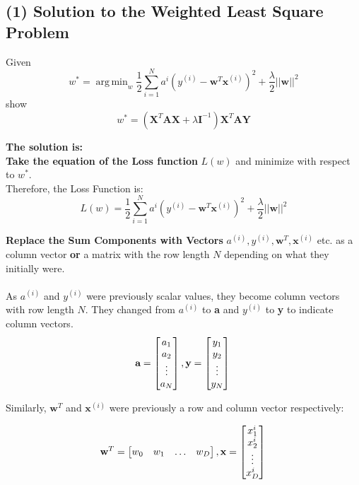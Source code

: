 \documentclass[10pt]{article}
\begin{document}
\subsection{(1) Solution to the Weighted Least Square Problem}
\label{sec:lsp}
Given 
\[w^{*} = 
\operatorname{arg\,min}_w 
\frac{1}{2} 
\sum_{i=1}^{N}
a^{i}
(y^{(i)} - \textbf{w}^T\textbf{x}^{(i)})^2
+
\frac{\lambda}{2}
||\textbf{w}||^2
\]
show
\[w^{*} = 
(
\textbf{X}^T
\textbf{A}
\textbf{X}
+
\lambda
\textbf{I}^{-1}
)
\textbf{X}^T
\textbf{A}
\textbf{Y}
\]

\textbf{The solution is:}
\\
\textbf{Take the equation of the Loss function} $L(w)$ and minimize with respect to $w^*$.
\\
Therefore, the Loss Function is: 
\[L(w) = 
\frac{1}{2} 
\sum_{i=1}^{N}
a^{i}
(y^{(i)} - \textbf{w}^T\textbf{x}^{(i)})^2
+
\frac{\lambda}{2}
||\textbf{w}||^2
\]

\textbf{Replace the Sum Components with Vectors}  $a^{(i)}, y^{(i)}, \textbf{w}^T, \textbf{x}^{(i)}  $ etc. as a column vector \textbf{or} a matrix with the row length $N$ depending on what they initially were.
\\ \\
As $a^{(i)}$ and $y^{(i)}$ were previously scalar values, they become column vectors with row 
length $N$. They changed from $a^{(i)}$ to \textbf{a} and $y^{(i)}$ to \textbf{y} to indicate column vectors.
\[\textbf{a} = 
\begin{bmatrix}a_{1} \\ a_{2} \\ \vdots \\ a_{N} \end{bmatrix}
\\
,
\textbf{y} = 
\begin{bmatrix}y_{1} \\ y_{2} \\ \vdots \\ y_{N} \end{bmatrix}
\\
\]

Similarly, $\textbf{w}^T$ and $\textbf{x}^{(i)}$ were previously a row and column vector respectively: 

\[\textbf{w}^{T} = 
\begin{bmatrix}w_{0} & w_{1} & \hdots & w_{D} \end{bmatrix}
\\
,
\textbf{x} = 
\begin{bmatrix}x_{1}^{i} \\ x_{2}^{i} \\ \vdots \\ x_{D}^{i} \end{bmatrix}
\\
\]
\end{document}
